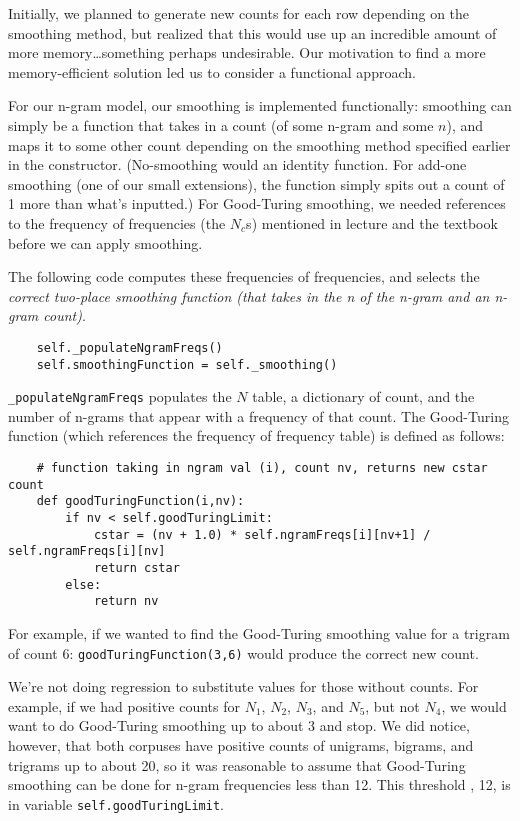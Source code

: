 \documentclass{article}
\begin{document}
Initially, we planned to generate new counts for each row depending on the smoothing method, but realized that this would use up an incredible amount of more memory\ldots something perhaps undesirable. Our motivation to find a more memory-efficient solution led us to consider a functional approach.\par
For our n-gram model, our smoothing is implemented functionally: smoothing can simply be a function that takes in a count (of some n-gram and some $n$), and maps it to some other count depending on the smoothing method specified earlier in the constructor. (No-smoothing would an identity function. For add-one smoothing (one of our small extensions), the function simply spits out a count of 1 more than what's inputted.) For Good-Turing smoothing, we needed references to the frequency of frequencies (the $N_c$s) mentioned in lecture and the textbook before we can apply smoothing.\par

The following code computes these frequencies of frequencies, and selects the \emph{correct two-place smoothing function (that takes in the \emph{n} of the n-gram and an n-gram count)}.

{\small\begin{verbatim}
    self._populateNgramFreqs()
    self.smoothingFunction = self._smoothing()
\end{verbatim}}

\texttt{\_populateNgramFreqs} populates the $N$ table, a dictionary of count, and the number of n-grams that appear with a frequency of that count. The Good-Turing function (which references the frequency of frequency table) is defined as follows:

{\small\begin{verbatim}
    # function taking in ngram val (i), count nv, returns new cstar count
    def goodTuringFunction(i,nv):
        if nv < self.goodTuringLimit:
            cstar = (nv + 1.0) * self.ngramFreqs[i][nv+1] / self.ngramFreqs[i][nv]
            return cstar
        else:
            return nv
\end{verbatim}}

For example, if we wanted to find the Good-Turing smoothing value for a trigram of count 6: \texttt{goodTuringFunction(3,6)} would produce the correct new count.

We're not doing regression to substitute values for those without counts. For example, if we had positive counts for $N_1$, $N_2$, $N_3$, and $N_5$, but not $N_4$, we would want to do Good-Turing smoothing up to about 3 and stop. We did notice, however, that both corpuses have positive counts of unigrams, bigrams, and trigrams up to about 20, so it was reasonable to assume that Good-Turing smoothing can be done for n-gram frequencies less than 12. This threshold , 12, is in variable \texttt{self.goodTuringLimit}.
\end{document}
